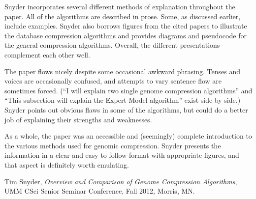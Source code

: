\documentclass[12pt,letterpaper]{article}
\begin{document}
Snyder incorporates several different methods of explanation throughout the paper. All of the algorithms are described in prose. Some, as discussed earlier, include examples. Snyder also borrows figures from the cited papers to illustrate the database compression algorithms and provides diagrams and pseudocode for the general compression algorithms. Overall, the different presentations complement each other well.

The paper flows nicely despite some occasional awkward phrasing. Tenses and voices are occasionally confused, and attempts to vary sentence flow are sometimes forced. (``I will explain two single genome compression algorithms'' and ``This subsection will explain the Expert Model algorithm'' exist side by side.) Snyder points out obvious flaws in some of the algorithms, but could do a better job of explaining their strengths and weaknesses.

As a whole, the paper was an accessible and (seemingly) complete introduction to the various methods used for genomic compression. Snyder presents the information in a clear and easy-to-follow format with appropriate figures, and that aspect is definitely worth emulating. 

\begin{thebibliography}{9}

  Tim Snyder,
  \emph{Overview and Comparison of Genome Compression Algorithms},
  UMM CSci Senior Seminar Conference, Fall 2012, Morris, MN.

\end{thebibliography}
\end{document}
